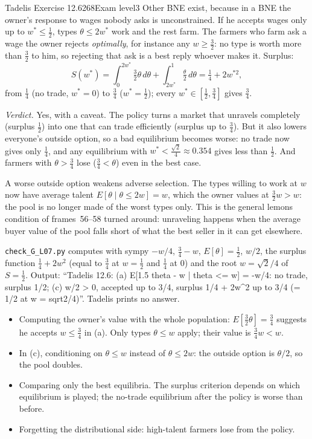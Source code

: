 \begin{exsol}{Tadelis Exercise 12.6}{268}{Exam level}{3}
Other BNE exist, because in a BNE the owner's response to wages nobody asks is unconstrained. If he accepts
wages only up to $w^* \le \frac12$, types $\theta \le 2w^*$ work and the rest farm. The farmers who farm
ask a wage the owner rejects \emph{optimally}, for instance any $w \ge \frac32$: no type is worth more
than $\frac32$ to him, so rejecting that ask is a best reply whoever makes it. Surplus:
\[
  S(w^*) = \int_0^{2w^*} \tfrac32\theta\, d\theta + \int_{2w^*}^1 \tfrac{\theta}{2}\, d\theta
  = \tfrac14 + 2w^{*2},
\]
from $\frac14$ (no trade, $w^* = 0$) to $\frac34$ ($w^* = \frac12$); every $w^* \in [\frac12, \frac34]$ gives $\frac34$.

\emph{Verdict.} Yes, with a caveat. The policy turns a market that unravels completely (surplus $\frac12$) into one
that can trade efficiently (surplus up to $\frac34$). But it also lowers everyone's outside option, so a
bad equilibrium becomes worse: no trade now gives only $\frac14$, and any equilibrium with
$w^* < \frac{\sqrt2}{4} \approx 0.354$ gives less than $\frac12$. And farmers with $\theta > \frac34$ lose
($\frac34 < \theta$) even in the best case.

\interp A worse outside option weakens adverse selection. The types willing to work at $w$ now have average talent
$E[\theta \mid \theta \le 2w] = w$, which the owner values at $\frac32 w > w$: the pool is no longer made of the
worst types only. This is the general lemons condition of frames~56--58 turned around: unraveling happens
when the average buyer value of the pool falls short of what the best seller in it can get elsewhere.

\verify \texttt{check\_G\_L07.py} computes with sympy $-w/4$, $\frac34 - w$, $E[\theta] = \frac12$, $w/2$, the surplus
function $\frac14 + 2w^2$ (equal to $\frac34$ at $w = \frac12$ and $\frac14$ at $0$) and the root $w = \sqrt2/4$ of
$S = \frac12$. Output: ``Tadelis 12.6: (a) E[1.5 theta - w | theta <= w] = -w/4: no trade, surplus 1/2; (c) w/2 > 0,
accepted up to 3/4, surplus 1/4 + 2w\^{}2 up to 3/4 (= 1/2 at w = sqrt2/4)''. Tadelis prints no answer.

\mistakes
\begin{itemize}
  \item Computing the owner's value with the whole population: $E[\frac32\theta] = \frac34$ suggests he accepts
  $w \le \frac34$ in (a). Only types $\theta \le w$ apply; their value is $\frac34 w < w$.
  \item In (c), conditioning on $\theta \le w$ instead of $\theta \le 2w$: the outside option is $\theta/2$, so
  the pool doubles.
  \item Comparing only the best equilibria. The surplus criterion depends on which equilibrium is played;
  the no-trade equilibrium after the policy is worse than before.
  \item Forgetting the distributional side: high-talent farmers lose from the policy.
\end{itemize}


\end{exsol}
